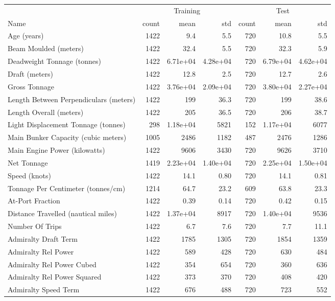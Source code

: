 
\begin{tabular}[t]{lrrrrrr}
\toprule
\multicolumn{1}{c}{ } & \multicolumn{3}{c}{Training} & \multicolumn{3}{c}{Test} \\
\cmidrule(l{3pt}r{3pt}){2-4} \cmidrule(l{3pt}r{3pt}){5-7}
Name & count & mean & std & count & mean & std\\
\midrule
Age (years) & 1422 & 9.4 & 5.5 & 720 & 10.8 & 5.5\\
Beam Moulded (meters) & 1422 & 32.4 & 5.5 & 720 & 32.3 & 5.9\\
Deadweight Tonnage (tonnes) & 1422 & 6.71e+04 & 4.28e+04 & 720 & 6.79e+04 & 4.62e+04\\
Draft (meters) & 1422 & 12.8 & 2.5 & 720 & 12.7 & 2.6\\
Gross Tonnage & 1422 & 3.76e+04 & 2.09e+04 & 720 & 3.80e+04 & 2.27e+04\\
\addlinespace
Length Between Perpendiculars (meters) & 1422 & 199 & 36.3 & 720 & 199 & 38.6\\
Length Overall (meters) & 1422 & 205 & 36.5 & 720 & 206 & 38.7\\
Light Displacement Tonnage (tonnes) & 298 & 1.18e+04 & 5821 & 152 & 1.17e+04 & 6077\\
Main Bunker Capacity (cubic meters) & 1005 & 2486 & 1182 & 487 & 2476 & 1286\\
Main Engine Power (kilowatts) & 1422 & 9606 & 3430 & 720 & 9626 & 3710\\
\addlinespace
Net Tonnage & 1419 & 2.23e+04 & 1.40e+04 & 720 & 2.25e+04 & 1.50e+04\\
Speed (knots) & 1422 & 14.1 & 0.80 & 720 & 14.1 & 0.81\\
Tonnage Per Centimeter (tonnes/cm) & 1214 & 64.7 & 23.2 & 609 & 63.8 & 23.3\\
At-Port Fraction & 1422 & 0.39 & 0.14 & 720 & 0.42 & 0.15\\
Distance Travelled (nautical miles) & 1422 & 1.37e+04 & 8917 & 720 & 1.40e+04 & 9536\\
\addlinespace
Number Of Trips & 1422 & 6.7 & 7.6 & 720 & 7.7 & 11.1\\
Admiralty Draft Term & 1422 & 1785 & 1305 & 720 & 1854 & 1359\\
Admiralty Rel Power & 1422 & 589 & 428 & 720 & 630 & 484\\
Admiralty Rel Power Cubed & 1422 & 354 & 654 & 720 & 360 & 636\\
Admiralty Rel Power Squared & 1422 & 373 & 370 & 720 & 408 & 420\\
\addlinespace
Admiralty Speed Term & 1422 & 676 & 488 & 720 & 723 & 552\\

\end{tabular}
